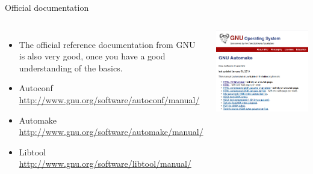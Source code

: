 \begin{frame}{Official documentation}
  \begin{columns}
    \begin{itemize}
    \item The official reference documentation from GNU is also very
      good, once you have a good understanding of the basics.
    \item Autoconf\\
      {\small \url{http://www.gnu.org/software/autoconf/manual/}}
    \item Automake\\
      {\small \url{http://www.gnu.org/software/automake/manual/}}
    \item Libtool\\
      {\small \url{http://www.gnu.org/software/libtool/manual/}}
    \end{itemize}
    \includegraphics[width=\textwidth]{slides/autotools-references/automake-manual.png}
  \end{columns}
\end{frame}

